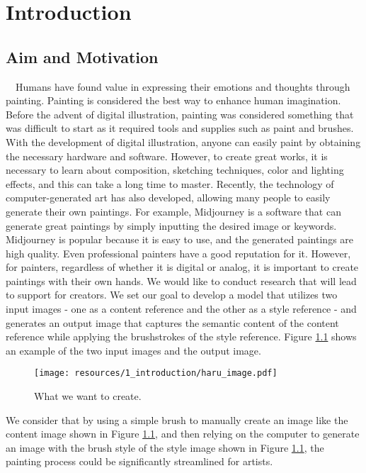 \chapter{Introduction}
\section{Aim and Motivation}
　Humans have found value in expressing their emotions and thoughts through 
painting. Painting is considered the best way to enhance human imagination. 
Before the advent of digital illustration, painting was considered something 
that was difficult to start as it required tools and supplies such as paint 
and brushes. With the development of digital illustration, anyone can easily 
paint by obtaining the necessary hardware and software.
However, to create great works, it is necessary to learn about composition, 
sketching techniques, color and lighting effects, and this can take a long 
time to master. Recently, the technology of computer-generated art has also 
developed, allowing many people to easily generate their own paintings. For 
example, Midjourney \cite{midjourney} is a software that can generate great 
paintings by simply inputting the desired image or keywords. Midjourney is 
popular because it is easy to use, and the generated paintings are high quality. 
Even professional painters have a good reputation for it.
However, for painters, regardless of whether it is digital or analog, it is 
important to create paintings with their own hands. We would like to conduct 
research that will lead to support for creators. 
We set our goal  to develop a model that utilizes two input images 
- one as a content reference and the other as a style reference - 
and generates an output image that captures the semantic content of the content 
reference while applying the brushstrokes of the style reference. 
Figure \ref{haru-image} shows an example of the two input images and the output image.
\begin{figure}[h]
    \centering
    \texttt{[image: resources/1\_introduction/haru\_image.pdf]}
    \caption{
        What we want to create.
    } 
    \label{haru-image}
\end{figure}
We consider that by using a simple brush to manually create an image like the 
content image shown in Figure \ref{haru-image}, and then relying on the computer 
to generate an image with the brush style of the style image shown in Figure 
\ref{haru-image}, the painting process could be significantly streamlined for 
artists.

